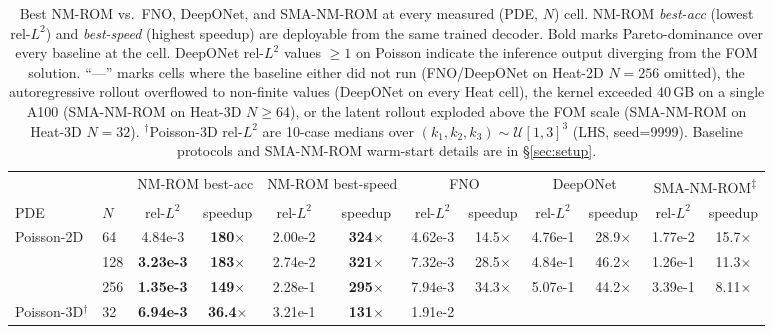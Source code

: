 \documentclass{article}
\begin{document}
  \begin{table}[!htbp]
  \centering
  \caption{Best NM-ROM vs.\ FNO, DeepONet, and SMA-NM-ROM
  \citep{KimChoi2022NMROM} at every measured (PDE, $N$) cell. NM-ROM
  \emph{best-acc} (lowest rel-$L^2$) and \emph{best-speed} (highest
  speedup) are deployable from the same trained decoder. Bold marks
  Pareto-dominance over every baseline at the cell. DeepONet rel-$L^2$
  values $\geq 1$ on Poisson indicate the inference output diverging
  from the FOM solution. ``---'' marks cells where the baseline either
  did not run (FNO/DeepONet on Heat-2D $N{=}256$ omitted), the
  autoregressive rollout overflowed to non-finite values
  (DeepONet on every Heat cell), the kernel exceeded 40\,GB on a
  single A100 (SMA-NM-ROM on Heat-3D $N{\geq}64$), or the latent
  rollout exploded above the FOM scale (SMA-NM-ROM on Heat-3D $N{=}32$).
  $^{\dagger}$Poisson-3D rel-$L^2$ are 10-case medians over
  $(k_1,k_2,k_3)\sim\mathcal{U}[1,3]^3$ (LHS, seed=9999). Baseline
  protocols and SMA-NM-ROM warm-start details are in \S\ref{sec:setup}.}
  \label{tab:operators}
  \setlength{\tabcolsep}{3pt}
  \renewcommand{\arraystretch}{1.1}
  \scriptsize
  \begin{tabular}{llcccccccccc}
  \toprule
  & & \multicolumn{2}{c}{NM-ROM best-acc} &
      \multicolumn{2}{c}{NM-ROM best-speed} &
      \multicolumn{2}{c}{FNO} &
      \multicolumn{2}{c}{DeepONet} &
      \multicolumn{2}{c}{SMA-NM-ROM\textsuperscript{$\ddagger$}} \\
  \cmidrule(lr){3-4} \cmidrule(lr){5-6} \cmidrule(lr){7-8}
  \cmidrule(lr){9-10} \cmidrule(lr){11-12}
  PDE & $N$ & rel-$L^2$ & speedup & rel-$L^2$ & speedup
                    & rel-$L^2$ & speedup & rel-$L^2$ & speedup
                    & rel-$L^2$ & speedup \\
  \midrule
  \multirow{3}{*}{Poisson-2D}
    &  64 & 4.84e-3          & \textbf{180}$\times$ & 2.00e-2 & \textbf{324}$\times$ & 4.62e-3 &
  14.5$\times$ & 4.76e-1 & 28.9$\times$ & 1.77e-2 & 15.7$\times$ \\
    & 128 & \textbf{3.23e-3} & \textbf{183}$\times$ & 2.74e-2 & \textbf{321}$\times$ & 7.32e-3 &
  28.5$\times$ & 4.84e-1 & 46.2$\times$ & 1.26e-1 & 11.3$\times$ \\
    & 256 & \textbf{1.35e-3} & \textbf{149}$\times$ & 2.28e-1 & \textbf{295}$\times$ & 7.94e-3 &
  34.3$\times$ & 5.07e-1 & 44.2$\times$ & 3.39e-1 & 8.11$\times$ \\
  \midrule
  \multirow{3}{*}{Poisson-3D$^{\dagger}$}
    &  32 & \textbf{6.94e-3} & \textbf{36.4}$\times$ & 3.21e-1 & \textbf{131}$\times$ & 1.91e-2 &

\end{tabular}
\end{table}
\end{document}
